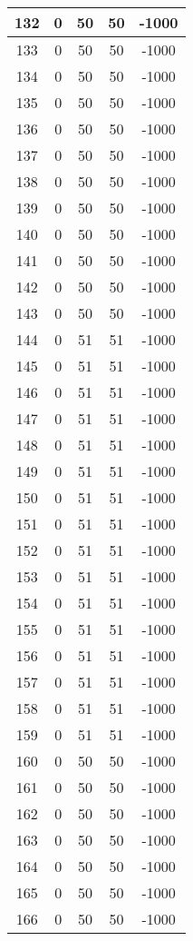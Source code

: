 \documentclass[letterpaper, 12pt]{article}
\begin{document}
\begin{longtable}{|c|c|c|c|c|}
\hline
132 & 0 & 50 & 50 & -1000 \\
\hline
133 & 0 & 50 & 50 & -1000 \\
\hline
134 & 0 & 50 & 50 & -1000 \\
\hline
135 & 0 & 50 & 50 & -1000 \\
\hline
136 & 0 & 50 & 50 & -1000 \\
\hline
137 & 0 & 50 & 50 & -1000 \\
\hline
138 & 0 & 50 & 50 & -1000 \\
\hline
139 & 0 & 50 & 50 & -1000 \\
\hline
140 & 0 & 50 & 50 & -1000 \\
\hline
141 & 0 & 50 & 50 & -1000 \\
\hline
142 & 0 & 50 & 50 & -1000 \\
\hline
143 & 0 & 50 & 50 & -1000 \\
\hline
144 & 0 & 51 & 51 & -1000 \\
\hline
145 & 0 & 51 & 51 & -1000 \\
\hline
146 & 0 & 51 & 51 & -1000 \\
\hline
147 & 0 & 51 & 51 & -1000 \\
\hline
148 & 0 & 51 & 51 & -1000 \\
\hline
149 & 0 & 51 & 51 & -1000 \\
\hline
150 & 0 & 51 & 51 & -1000 \\
\hline
151 & 0 & 51 & 51 & -1000 \\
\hline
152 & 0 & 51 & 51 & -1000 \\
\hline
153 & 0 & 51 & 51 & -1000 \\
\hline
154 & 0 & 51 & 51 & -1000 \\
\hline
155 & 0 & 51 & 51 & -1000 \\
\hline
156 & 0 & 51 & 51 & -1000 \\
\hline
157 & 0 & 51 & 51 & -1000 \\
\hline
158 & 0 & 51 & 51 & -1000 \\
\hline
159 & 0 & 51 & 51 & -1000 \\
\hline
160 & 0 & 50 & 50 & -1000 \\
\hline
161 & 0 & 50 & 50 & -1000 \\
\hline
162 & 0 & 50 & 50 & -1000 \\
\hline
163 & 0 & 50 & 50 & -1000 \\
\hline
164 & 0 & 50 & 50 & -1000 \\
\hline
165 & 0 & 50 & 50 & -1000 \\
\hline
166 & 0 & 50 & 50 & -1000 \\

\end{longtable}
\end{document}

